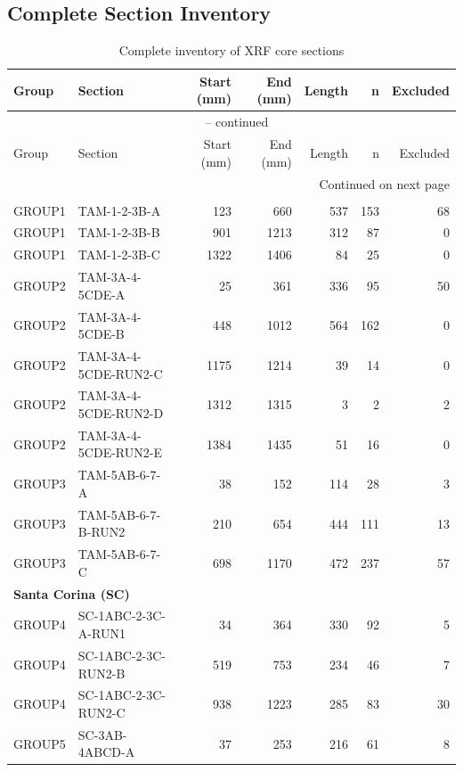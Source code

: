 \documentclass[11pt,a4paper]{article}
\begin{document}
\subsection{Complete Section Inventory}

\begin{longtable}{llrrrrr}
\caption{Complete inventory of XRF core sections} \label{tab:inventory} \\
\toprule
Group & Section & Start (mm) & End (mm) & Length & n & Excluded \\
\midrule
\endfirsthead
\multicolumn{7}{c}{{\tablename\ \thetable{} -- continued}} \\
\toprule
Group & Section & Start (mm) & End (mm) & Length & n & Excluded \\
\midrule
\endhead
\midrule
\multicolumn{7}{r}{{Continued on next page}} \\
\endfoot
\bottomrule
\endlastfoot
\multicolumn{7}{l}{\textbf{Tamshiyacu (TAM)}} \\
GROUP1 & TAM-1-2-3B-A & 123 & 660 & 537 & 153 & 68 \\
GROUP1 & TAM-1-2-3B-B & 901 & 1213 & 312 & 87 & 0 \\
GROUP1 & TAM-1-2-3B-C & 1322 & 1406 & 84 & 25 & 0 \\
\midrule
GROUP2 & TAM-3A-4-5CDE-A & 25 & 361 & 336 & 95 & 50 \\
GROUP2 & TAM-3A-4-5CDE-B & 448 & 1012 & 564 & 162 & 0 \\
GROUP2 & TAM-3A-4-5CDE-RUN2-C & 1175 & 1214 & 39 & 14 & 0 \\
GROUP2 & TAM-3A-4-5CDE-RUN2-D & 1312 & 1315 & 3 & 2 & 2 \\
GROUP2 & TAM-3A-4-5CDE-RUN2-E & 1384 & 1435 & 51 & 16 & 0 \\
\midrule
GROUP3 & TAM-5AB-6-7-A & 38 & 152 & 114 & 28 & 3 \\
GROUP3 & TAM-5AB-6-7-B-RUN2 & 210 & 654 & 444 & 111 & 13 \\
GROUP3 & TAM-5AB-6-7-C & 698 & 1170 & 472 & 237 & 57 \\
\midrule
\multicolumn{7}{l}{\textbf{Santa Corina (SC)}} \\
GROUP4 & SC-1ABC-2-3C-A-RUN1 & 34 & 364 & 330 & 92 & 5 \\
GROUP4 & SC-1ABC-2-3C-RUN2-B & 519 & 753 & 234 & 46 & 7 \\
GROUP4 & SC-1ABC-2-3C-RUN2-C & 938 & 1223 & 285 & 83 & 30 \\
\midrule
GROUP5 & SC-3AB-4ABCD-A & 37 & 253 & 216 & 61 & 8 \\

\end{longtable}
\end{document}
